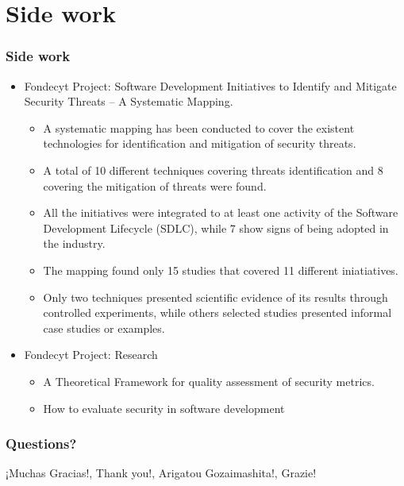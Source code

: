 \documentclass[serif,9pt]{beamer}
\begin{document}
\section{Side work}
\begin{frame}
	\frametitle{Side work}
	\begin{itemize}
		\item<1-> Fondecyt Project: Software Development Initiatives to Identify and Mitigate Security Threats -- A Systematic Mapping.
			\begin{itemize}
				\item<2> A systematic mapping has been conducted to cover the existent technologies for identification and mitigation of security threats.
				\item<3> A total of 10 different techniques covering threats identification and 8 covering the mitigation of threats were found. 
				\item<4> All the initiatives were integrated to at least one activity of the Software Development Lifecycle (SDLC), while 7 show signs of being adopted in the industry. 
				\item<5> The mapping found only 15 studies that covered 11 different iniatiatives. 
				\item<6> Only two techniques presented scientific evidence of its results through controlled experiments, while others selected studies presented informal case studies or examples.
			\end{itemize}
		\item<7-> Fondecyt Project: Research
			\begin{itemize}
				\item<8> A Theoretical Framework for quality assessment of security metrics.
				\item<9> How to evaluate security in software development
			\end{itemize}
	\end{itemize}
\end{frame}


\begin{frame}
	\frametitle{Questions?}
	¡Muchas Gracias!, Thank you!, Arigatou Gozaimashita!, Grazie!
\end{frame}



\end{document}
